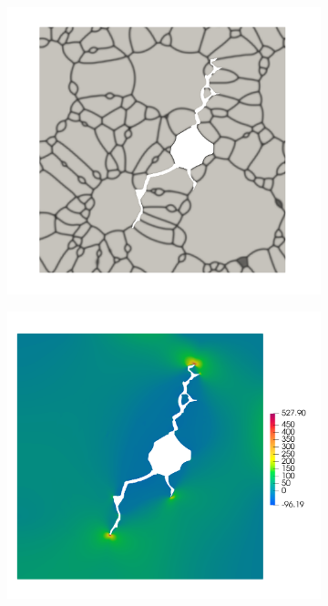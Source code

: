 \begin{figure}[htb!]
\begin{subfigure}[t]{0.4\linewidth}
    \caption{}
  \end{subfigure}\\
  \begin{subfigure}[t]{0.4\linewidth}
    \centering
    \includegraphics[width=\linewidth]{Chapter3/figures/partial_hbs_2}
    \caption{}
  \end{subfigure}
  \begin{subfigure}[t]{0.4\linewidth}
    \centering
    \includegraphics[width=\linewidth]{Chapter3/figures/partial_hbs_2_stress}

\end{subfigure}
\end{figure}
